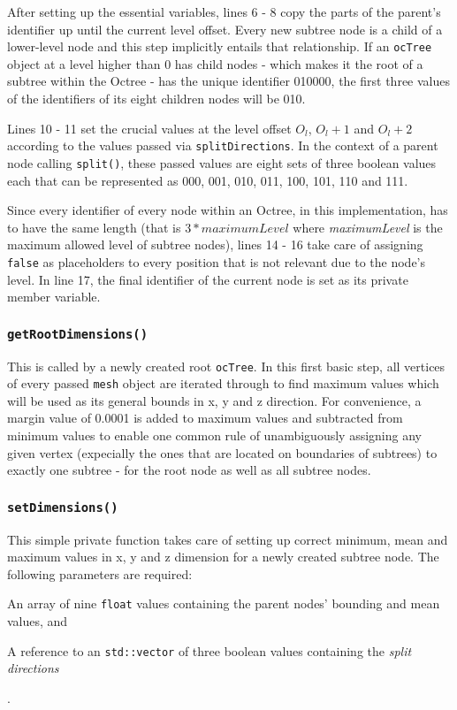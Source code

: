 After setting up the essential variables, lines 6 - 8 copy the parts of the parent's identifier up until the current level offset. Every new subtree node is a child of a lower-level node and this step implicitly entails that relationship. If an \texttt{ocTree} object at a level higher than 0 has child nodes - which makes it the root of a subtree within the Octree - has the unique identifier 010000, the first three values of the identifiers of its eight children nodes will be 010.

Lines 10 - 11 set the crucial values at the level offset $O_l$, $O_l+1$ and $O_l+2$ according to the values passed via \texttt{splitDirections}. In the context of a parent node calling \texttt{split()}, these passed values are eight sets of three boolean values each that can be represented as 000, 001, 010, 011, 100, 101, 110 and 111.

Since every identifier of every node within an Octree, in this implementation, has to have the same length (that is $3*maximumLevel$ where \textit{maximumLevel} is the maximum allowed level of subtree nodes), lines 14 - 16 take care of assigning \texttt{false} as placeholders to every position that is not relevant due to the node's level. In line 17, the final identifier of the current node is set as its private member variable.

	\subsubsection{\texttt{getRootDimensions()}}
This is called by a newly created root \texttt{ocTree}. In this first basic step, all vertices of every passed \texttt{mesh} object are iterated through to find maximum values which will be used as its general bounds in x, y and z direction. For convenience, a margin value of 0.0001 is added to maximum values and subtracted from minimum values to enable one common rule of unambiguously assigning any given vertex (expecially the ones that are located on boundaries of subtrees) to exactly one subtree - for the root node as well as all subtree nodes.

	\subsubsection{\texttt{setDimensions()}}
	\label{sec:setDimensions}
This simple private function takes care of setting up correct minimum, mean and maximum values in x, y and z dimension for a newly created subtree node. The following parameters are required:
\begin{enumerate*}
	\item An array of nine \texttt{float} values containing the parent nodes' bounding and mean values, and
	\item A reference to an \texttt{std::vector} of three boolean values containing the \textit{split directions}
\end{enumerate*}.

